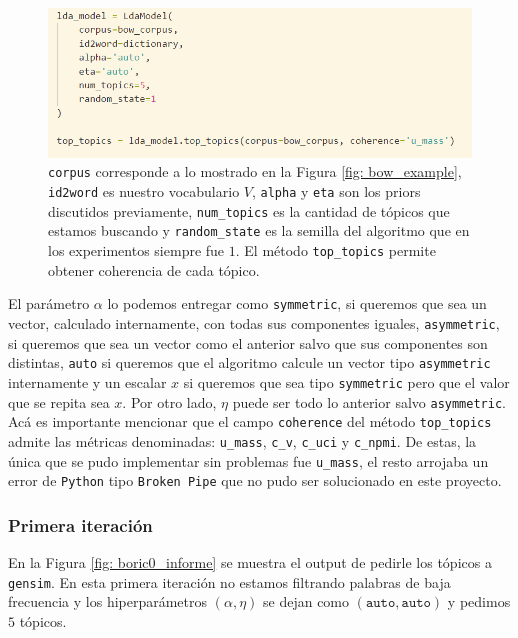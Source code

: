 \documentclass{article}
\begin{document}
	\begin{figure}[H]
		\centering
		\includegraphics[scale=.4]{../imgs/gensim_code_informe.png}
		\caption{\texttt{corpus} corresponde a lo mostrado en la Figura \ref{fig: bow_example}, \texttt{id2word} es nuestro vocabulario $V$, \texttt{alpha} y \texttt{eta} son los priors discutidos previamente, \texttt{num\_topics} es la cantidad de tópicos que estamos buscando y \texttt{random\_state} es la semilla del algoritmo que en los experimentos siempre fue $1$. El método \texttt{top\_topics} permite obtener coherencia de cada tópico.}
		\label{fig: gensim_code_informe}
	\end{figure}
	El parámetro $\alpha$ lo podemos entregar como \texttt{symmetric}, si queremos que sea un vector, calculado internamente, con todas sus componentes iguales, \texttt{asymmetric}, si queremos que sea un vector como el anterior salvo que sus componentes son distintas, \texttt{auto} si queremos que el algoritmo calcule un vector tipo \texttt{asymmetric} internamente y un escalar $x$ si queremos que sea tipo \texttt{symmetric} pero que el valor que se repita sea $x$. Por otro lado, $\eta$ puede ser todo lo anterior salvo \texttt{asymmetric}. Acá es importante mencionar que el campo \texttt{coherence} del método \texttt{top\_topics} admite las métricas denominadas: \texttt{u\_mass}, \texttt{c\_v}, \texttt{c\_uci} y \texttt{c\_npmi}. De estas, la única que se pudo implementar sin problemas fue \texttt{u\_mass}, el resto arrojaba un error de \texttt{Python} tipo \texttt{Broken Pipe} que no pudo ser solucionado en este proyecto.
	
	\subsubsection{Primera iteración}
	 En la Figura \ref{fig: boric0_informe} se muestra el output de pedirle los tópicos a \texttt{gensim}. En esta primera iteración no estamos filtrando palabras de baja frecuencia y los hiperparámetros $(\alpha, \eta)$ se dejan como $(\texttt{auto}, \texttt{auto})$ y pedimos $5$ tópicos. 
	
\end{document}

